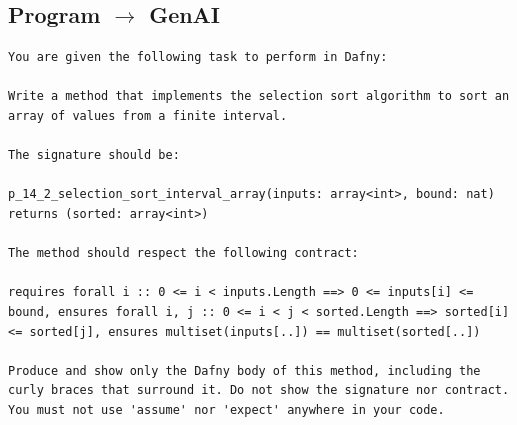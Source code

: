 \documentclass{article}
\begin{document}
\subsection*{Program $\rightarrow$ GenAI}
\begin{lstlisting}
You are given the following task to perform in Dafny:

Write a method that implements the selection sort algorithm to sort an array of values from a finite interval.

The signature should be:

p_14_2_selection_sort_interval_array(inputs: array<int>, bound: nat) returns (sorted: array<int>)

The method should respect the following contract:

requires forall i :: 0 <= i < inputs.Length ==> 0 <= inputs[i] <= bound, ensures forall i, j :: 0 <= i < j < sorted.Length ==> sorted[i] <= sorted[j], ensures multiset(inputs[..]) == multiset(sorted[..])

Produce and show only the Dafny body of this method, including the curly braces that surround it. Do not show the signature nor contract. You must not use 'assume' nor 'expect' anywhere in your code.
\end{lstlisting}
\end{document}

